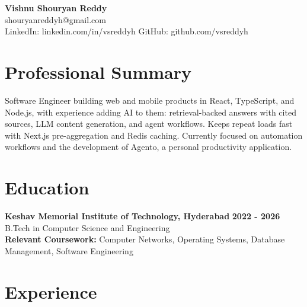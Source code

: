 \documentclass[a4paper,11pt]{article}
\newcommand{\resumeSubheading}[4]{%
  \textbf{#1} \hfill \textbf{#2} \\
{#3} \hfill {#4}
}
\begin{document}
\pagestyle{empty}
\raggedbottom
\addtolength{\textheight}{2\baselineskip}
\small

\begin{center}
  {\LARGE \textbf{Vishnu Shouryan Reddy}}\\[0.3em]
  shouryanreddyh@gmail.com \\[0.3em]
  LinkedIn: linkedin.com/in/vsreddyh \textbar{} GitHub: github.com/vsreddyh
\end{center}
\vspace{-0.8em}

\section*{Professional Summary}

Software Engineer building web and mobile products in React, TypeScript, and Node.js, with experience adding AI to them: retrieval-backed answers with cited sources, LLM content generation, and agent workflows. Keeps repeat loads fast with Next.js pre-aggregation and Redis caching. Currently focused on automation workflows and the development of Agento, a personal productivity application.

\section*{Education}

\resumeSubheading
{Keshav Memorial Institute of Technology, Hyderabad}{2022 - 2026}
{B.Tech in Computer Science and Engineering}{} \\
\textbf{Relevant Coursework:} Computer Networks, Operating Systems, Database Management, Software Engineering


\section*{Experience}
\end{document}
